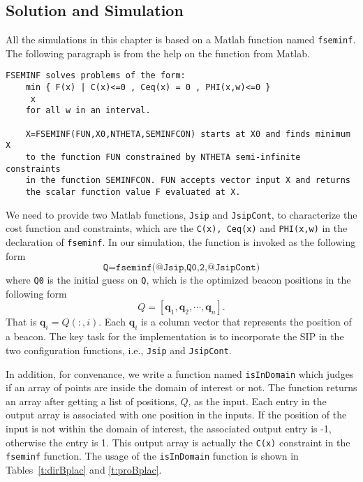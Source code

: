 \subsection{Solution and Simulation}
All the simulations in this chapter is based on a Matlab function named \texttt{fseminf}. The following paragraph is from the help on the function from Matlab.

\begin{verbatim}
FSEMINF solves problems of the form:
    min { F(x) | C(x)<=0 , Ceq(x) = 0 , PHI(x,w)<=0 }
     x
    for all w in an interval.

    X=FSEMINF(FUN,X0,NTHETA,SEMINFCON) starts at X0 and finds minimum X
    to the function FUN constrained by NTHETA semi-infinite constraints
    in the function SEMINFCON. FUN accepts vector input X and returns
    the scalar function value F evaluated at X.
\end{verbatim}

We need to provide two Matlab functions, \texttt{Jsip} and \texttt{JsipCont}, to characterize the cost function and constraints, which are the \texttt{C(x), Ceq(x)} and \texttt{PHI(x,w)} in the declaration of \texttt{fseminf}. In our simulation, the function is invoked as the following form
\begin{equation}\label{e:fseminf}
\texttt{Q=fseminf(@Jsip,Q0,2,@JsipCont)}
\end{equation}
where \texttt{Q0} is the initial guess on \texttt{Q}, which is the optimized beacon positions in the following form
$$ Q=[\mathbf{q}_1, \mathbf{q}_2, \cdots, \mathbf{q}_n].$$
That is $\mathbf{q}_i=Q(:,i)$.
    Each $\mathbf{q}_i$ is a column vector that represents the position of a beacon. The key task for the implementation is to incorporate the SIP in the two configuration functions, i.e., \texttt{Jsip} and \texttt{JsipCont}.

In addition, for convenance, we write a function named \texttt{isInDomain} which judges if an array of points are inside the domain of interest or not. The function returns an array after getting a list of positions, $Q$, as the input. Each entry in the output array is associated with one position in the inputs. If the position of the input is not within the domain of interest, the associated output entry is -1, otherwise the entry is 1. This output array is actually the \texttt{C(x)} constraint in the \texttt{fseminf} function. The usage of the \texttt{isInDomain} function is shown in Tables~\ref{t:dirBplac} and \ref{t:proBplac}.


